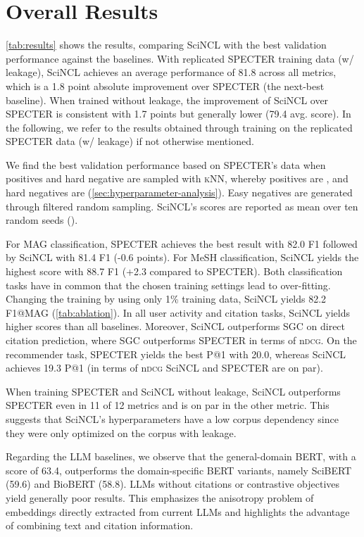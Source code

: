 \documentclass[11pt]{article}
\newcommand{\ndcg}{n\textsc{dcg}\xspace}
\newcommand{\knn}{\textsc{kNN}\xspace}
\newcommand{\sys}{SciNCL\xspace} \newcommand{\baselineCount}{10\xspace}
\begin{document}
\section{Overall Results}


\cref{tab:results} shows the results, comparing \sys with the best validation performance against the baselines.
With replicated SPECTER training data (w/ leakage), \sys achieves an average performance of 81.8 across all metrics, which is a 1.8 point absolute improvement over SPECTER (the next-best baseline). 
When trained without leakage, the improvement of \sys over SPECTER is consistent with 1.7 points but generally lower (79.4 avg. score).
In the following, we refer to the results obtained through training on the replicated SPECTER data (w/ leakage) if not otherwise mentioned.

We find the best validation performance based on SPECTER's data when positives and hard negative are sampled with \knn, whereby positives are , and hard negatives are  (\cref{sec:hyperparameter-analysis}).
Easy negatives are generated through filtered random sampling.
\sys's scores are reported as mean over ten random seeds ().

For MAG classification, SPECTER achieves the best result with 82.0 F1 followed by \sys with 81.4 F1 (-0.6 points).
For MeSH classification, \sys yields the highest score with 88.7 F1 (+2.3 compared to SPECTER).
Both classification tasks have in common that the chosen training settings lead to over-fitting.
Changing the training by using only 1\% training data, \sys yields 82.2 F1@MAG (\cref{tab:ablation}). In all user activity and citation tasks, \sys yields higher scores than all baselines.
Moreover, \sys outperforms SGC on direct citation prediction, where SGC outperforms SPECTER in terms of \ndcg.
On the recommender task, SPECTER yields the best P@1 with 20.0, whereas \sys achieves 19.3 P@1 (in terms of \ndcg \sys and SPECTER are on par).

When training SPECTER and \sys without leakage, \sys outperforms SPECTER even in 11 of 12 metrics and is on par in the other metric.
This suggests that \sys's hyperparameters have a low corpus dependency since they were only optimized on the corpus with leakage.

Regarding the LLM baselines, we observe that the general-domain BERT, with a score of 63.4, outperforms the domain-specific BERT variants, namely SciBERT (59.6) and BioBERT (58.8). LLMs without citations or contrastive objectives yield generally poor results.
This emphasizes the anisotropy problem of embeddings directly extracted from current LLMs and highlights the advantage of combining text and citation information. 
\end{document}
